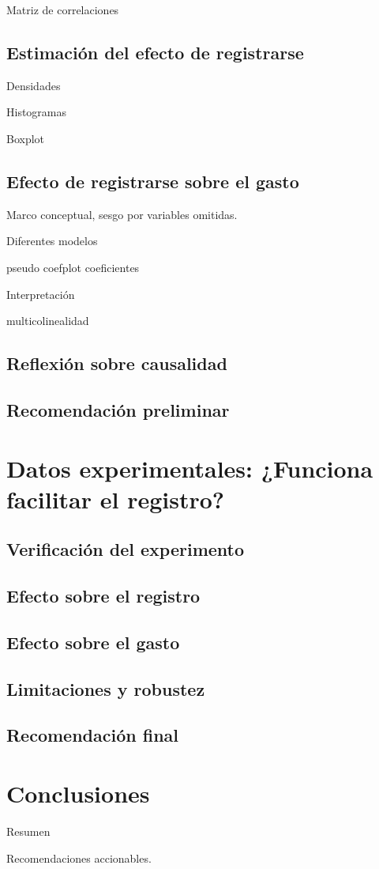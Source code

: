 \documentclass[conference]{IEEEtran}
\begin{document}
Matriz de correlaciones

\subsection{Estimación del efecto de registrarse}

Densidades

Histogramas

Boxplot

\subsection{Efecto de registrarse sobre el gasto}

Marco conceptual, sesgo por variables omitidas.

Diferentes modelos

pseudo coefplot coeficientes

Interpretación

multicolinealidad


\subsection{Reflexión sobre causalidad}

\subsection{Recomendación preliminar}


\section{Datos experimentales: ¿Funciona facilitar el registro?}

\subsection{Verificación del experimento}

\subsection{Efecto sobre el registro}

\subsection{Efecto sobre el gasto}

\subsection{Limitaciones y robustez}

\subsection{Recomendación final}

\section{Conclusiones}

Resumen 

Recomendaciones accionables.
\end{document}
